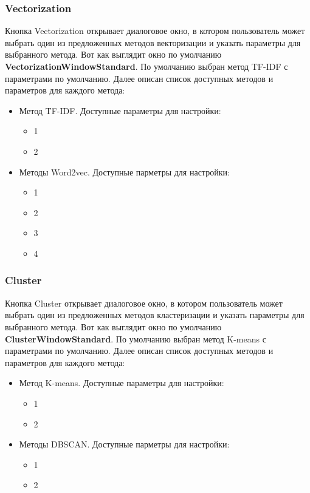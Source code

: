 		\subsubsection{Vectorization}
			Кнопка Vectorization открывает диалоговое окно, в котором пользователь может выбрать один из предложенных методов векторизации и указать параметры для выбранного метода. Вот как выглядит окно по умолчанию \textbf{VectorizationWindowStandard}. По умолчанию выбран метод TF-IDF с параметрами по умолчанию.
			Далее описан список доступных методов и параметров для каждого метода:
			\begin{itemize}
				\item Метод TF-IDF. Доступные параметры для настройки:
					\begin{itemize}
						\item 1
						\item 2
					\end{itemize}
				\item Методы Word2vec. Доступные парметры для настройки:
					\begin{itemize}
						\item 1
						\item 2
						\item 3
						\item 4
					\end{itemize}
			\end{itemize}
			
		\subsubsection{Cluster}
			Кнопка Cluster открывает диалоговое окно, в котором пользователь может выбрать один из предложенных методов кластеризации и указать параметры для выбранного метода. Вот как выглядит окно по умолчанию \textbf{ClusterWindowStandard}. По умолчанию выбран метод K-means с параметрами по умолчанию.
			Далее описан список доступных методов и параметров для каждого метода:
			\begin{itemize}
				\item Метод K-means. Доступные параметры для настройки:
					\begin{itemize}
						\item 1
						\item 2
					\end{itemize}
				\item Методы DBSCAN. Доступные парметры для настройки:
					\begin{itemize}
						\item 1
						\item 2
					\end{itemize}
			\end{itemize}
			
